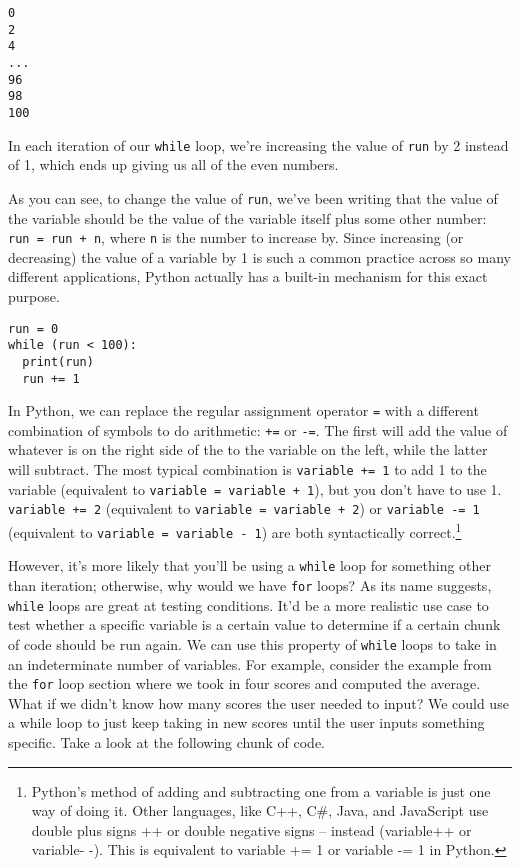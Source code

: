 \begin{lstlisting}
0
2
4
...
96
98
100
\end{lstlisting}
In each iteration of our \verb|while| loop, we're increasing the value of \verb|run| by 2 instead of 1, which ends up giving us all of the even numbers.\par
As you can see, to change the value of \verb|run|, we've been writing that the value of the variable should be the value of the variable itself plus some other number: \verb|run = run + n|, where \verb|n| is the number to increase by. Since increasing (or decreasing) the value of a variable by 1 is such a common practice across so many different applications, Python actually has a built-in mechanism for this exact purpose.\par
\begin{lstlisting}[style=pippython]
run = 0
while (run < 100):
  print(run)
  run += 1
\end{lstlisting}
In Python, we can replace the regular assignment operator \verb|=| with a different combination of symbols to do arithmetic: \verb|+=| or \verb|-=|. The first will add the value of whatever is on the right side of the to the variable on the left, while the latter will subtract. The most typical combination is \verb|variable += 1| to add 1 to the variable (equivalent to \verb|variable = variable + 1|), but you don't have to use 1. \verb|variable += 2| (equivalent to \verb|variable = variable + 2|) or \verb|variable -= 1| (equivalent to \verb|variable = variable - 1|) are both syntactically correct.\footnote{Python's method of adding and subtracting one from a variable is just one way of doing it. Other languages, like C++, C\#, Java, and JavaScript use double plus signs ++ or double negative signs -- instead (variable++ or variable- -). This is equivalent to variable += 1 or variable -= 1 in Python.}\par
However, it's more likely that you'll be using a \verb|while| loop for something other than iteration; otherwise, why would we have \verb|for| loops? As its name suggests, \verb|while| loops are great at testing conditions. It'd be a more realistic use case to test whether a specific variable is a certain value to determine if a certain chunk of code should be run again. We can use this property of \verb|while| loops to take in an indeterminate number of variables. For example, consider the example from the \verb|for| loop section where we took in four scores and computed the average. What if we didn't know how many scores the user needed to input? We could use a while loop to just keep taking in new scores until the user inputs something specific. Take a look at the following chunk of code.\par
